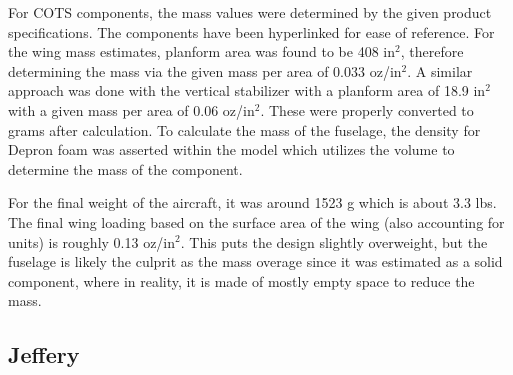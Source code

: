         For COTS components, the mass values were determined by the given product specifications. The components have been hyperlinked for ease of reference. For the wing mass estimates, planform area was found to be 408 in$^2$, therefore determining the mass via the given mass per area of 0.033 oz/in$^2$. A similar approach was done with the vertical stabilizer with a planform area of 18.9 in$^2$ with a given mass per area of 0.06 oz/in$^2$. These were properly converted to grams after calculation. To calculate the mass of the fuselage, the density for Depron foam was asserted within the model which utilizes the volume to determine the mass of the component.
        
        For the final weight of the aircraft, it was around 1523 g which is about 3.3 lbs. The final wing loading based on the surface area of the wing (also accounting for units) is roughly 0.13 oz/in$^2$. This puts the design slightly overweight, but the fuselage is likely the culprit as the mass overage since it was estimated as a solid component, where in reality, it is made of mostly empty space to reduce the mass. 
        
    \subsection{Jeffery}
    
